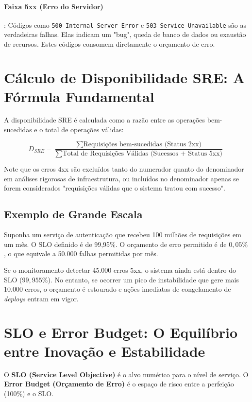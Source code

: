 \documentclass[12pt,a4paper,twoside]{report}
\begin{document}
\paragraph{Faixa 5xx (Erro do Servidor)}: Códigos como \texttt{500 Internal Server Error} e \texttt{503 Service Unavailable} são as verdadeiras falhas. Elas indicam um "bug", queda de banco de dados ou exaustão de recursos. Estes códigos consomem diretamente o orçamento de erro.

\section{Cálculo de Disponibilidade SRE: A Fórmula Fundamental}

A disponibilidade SRE é calculada como a razão entre as operações bem-sucedidas e o total de operações válidas:

\begin{equation}
    D_{SRE} = \frac{\sum \text{Requisições bem-sucedidas (Status 2xx)}}{\sum \text{Total de Requisições Válidas (Sucessos + Status 5xx)}}
\end{equation}

Note que os erros 4xx são excluídos tanto do numerador quanto do denominador em análises rigorosas de infraestrutura, ou incluídos no denominador apenas se forem considerados "requisições válidas que o sistema tratou com sucesso".

\subsection{Exemplo de Grande Escala}

Suponha um serviço de autenticação que recebeu 100 milhões de requisições em um mês. O SLO definido é de 99,95\%.
O orçamento de erro permitido é de $0,05\%$, o que equivale a 50.000 falhas permitidas por mês.

Se o monitoramento detectar 45.000 erros 5xx, o sistema ainda está dentro do SLO ($99,955\%$). No entanto, se ocorrer um pico de instabilidade que gere mais 10.000 erros, o orçamento é estourado e ações imediatas de congelamento de \textit{deploys} entram em vigor.

\section{SLO e Error Budget: O Equilíbrio entre Inovação e Estabilidade}

O \textbf{SLO (Service Level Objective)} é o alvo numérico para o nível de serviço. O \textbf{Error Budget (Orçamento de Erro)} é o espaço de risco entre a perfeição (100\%) e o SLO.
\end{document}
